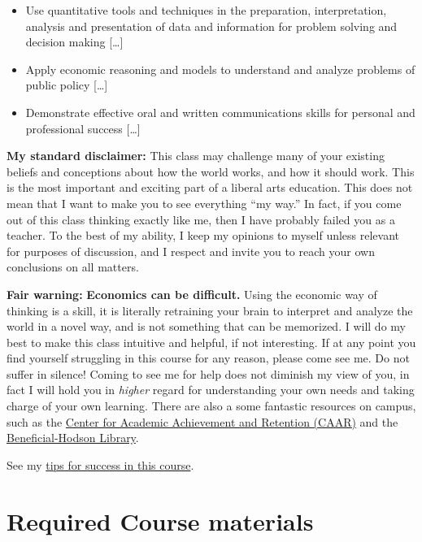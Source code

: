 \documentclass{article}
\providecommand{\tightlist}{%
  \setlength{\itemsep}{0pt}\setlength{\parskip}{0pt}}
\begin{document}
\begin{itemize}
\tightlist
\item
  Use quantitative tools and techniques in the preparation,
  interpretation, analysis and presentation of data and information for
  problem solving and decision making {[}\ldots{]}
\item
  Apply economic reasoning and models to understand and analyze problems
  of public policy {[}\ldots{]}
\item
  Demonstrate effective oral and written communications skills for
  personal and professional success {[}\ldots{]}
\end{itemize}

\textbf{My standard disclaimer:} This class may challenge many of your
existing beliefs and conceptions about how the world works, and how it
should work. This is the most important and exciting part of a liberal
arts education. This does not mean that I want to make you to see
everything ``my way.'' In fact, if you come out of this class thinking
exactly like me, then I have probably failed you as a teacher. To the
best of my ability, I keep my opinions to myself unless relevant for
purposes of discussion, and I respect and invite you to reach your own
conclusions on all matters.

\textbf{Fair warning:} \textbf{Economics can be difficult.} Using the
economic way of thinking is a skill, it is literally retraining your
brain to interpret and analyze the world in a novel way, and is not
something that can be memorized. I will do my best to make this class
intuitive and helpful, if not interesting. If at any point you find
yourself struggling in this course for any reason, please come see me.
Do not suffer in silence! Coming to see me for help does not diminish my
view of you, in fact I will hold you in \emph{higher} regard for
understanding your own needs and taking charge of your own learning.
There are also a some fantastic resources on campus, such as the
\href{http://www.hood.edu/campus-services/academic-services/index.html}{Center
for Academic Achievement and Retention (CAAR)} and the
\href{http://www.hood.edu/library/}{Beneficial-Hodson Library}.

See my \href{http://lawS21.classes.ryansafner.com/reference\#tips}{tips
for success in this course}.

\hypertarget{required-course-materials}{%
\section*{Required Course materials}\label{required-course-materials}}
\end{document}
